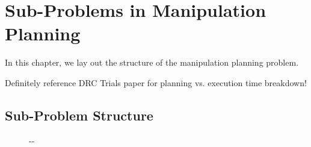 \documentclass{report}
\newlength{\offsetpage}
\newenvironment{widepage}
   {\begin{adjustwidth}{-\offsetpage}{-\offsetpage}%
    \addtolength{\textwidth}{2\offsetpage}}%
{\end{adjustwidth}}
\begin{document}
\newpage
\chapter{Sub-Problems in Manipulation Planning}
\label{chap:formulation}

In this chapter,
we lay out the structure of the manipulation planning problem.

Definitely reference DRC Trials paper for planning vs. execution
time breakdown!

\section{Sub-Problem Structure}

{
\setlength{\offsetpage}{0.5in}
\begin{figure}
\begin{widepage}
\begin{center}


\end{center}
\end{widepage}
\end{figure}}
\end{document}
